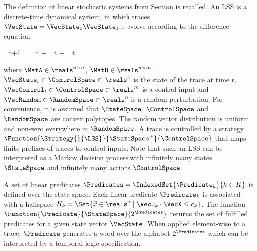 The definition of linear stochastic systems from Section  is recalled.
An LSS is a discrete-time dynamical system, in which traces $\VecState = \VecState_0 \VecState_1 ...$ evolve according to the difference equation

\startformula
    \VecState_{t+1} = \MatA \VecState_t + \MatB \VecControl_t + \VecRandom_t \EndComma
\stopformula

where $\MatA \in \reals^{n \times n}$, $\MatB \in \reals^{n \times m}$.
$\VecState_t \in \ControlSpace \subset \reals^n$ is the state of the trace at time $t$, $\VecControl_t \in \ControlSpace \subset \reals^m$ is a control input and $\VecRandom \in \RandomSpace \subset \reals^n$ is a random perturbation.
For convenience, it is assumed that $\StateSpace$, $\ControlSpace$ and $\RandomSpace$ are convex polytopes.
The random vector distribution is uniform and non-zero everywhere in $\RandomSpace$.
A trace is controlled by a strategy $\Function{\Strategy{}{\LSS}}{\StateSpace^+}{\ControlSpace}$ that maps finite prefixes of traces to control inputs.
Note that such an LSS can be interpreted as a Markov decision process with infinitely many states $\StateSpace$ and infinitely many actions $\ControlSpace$.

A set of linear predicates $\Predicates = \IndexedSet{\Predicate_k}{k \in K}$ is defined over the state space.
Each linear predicate $\Predicate_k$ is associated with a halfspace $H_k = \Set{ \Vec{x} \in \reals^n \mid \VecU_k \cdot \VecX \leq c_k }$.
The function $\Function{\Predicate}{\StateSpace}{2^\Predicates}$ returns the set of fulfilled predicates for a given state vector $\VecState$.
When applied element-wise to a trace, $\Predicate$ generates a word over the alphabet $2^\Predicates$ which can be interpreted by a temporal logic specification.


